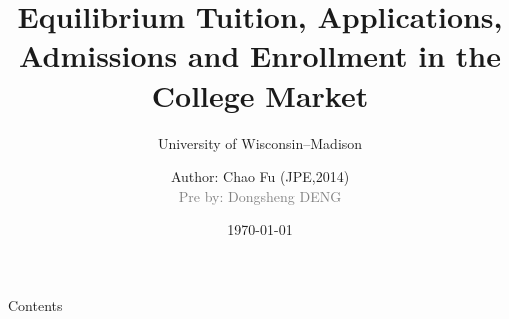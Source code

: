 \documentclass[10pt]{beamer}
\begin{document}
\title{Equilibrium Tuition, Applications, Admissions and Enrollment in the College Market}
\subtitle{University of Wisconsin--Madison}
\author[Chao Fu (JPE,2014)]{Author: Chao Fu (JPE,2014)\\
\small\textcolor{gray}{Pre by: Dongsheng DENG}}

\date{\today}

\begin{frame}[plain]
  \titlepage
\end{frame}

\begin{frame}{Contents}
\tableofcontents
\end{frame}


\end{document}
